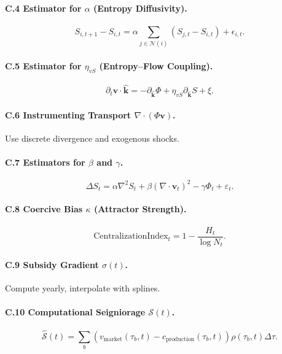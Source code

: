 \documentclass[12pt]{article}
\begin{document}
\paragraph{C.4 Estimator for \(\alpha\) (Entropy Diffusivity).}

\[
S_{i,t+1} - S_{i,t} = \alpha \sum_{j \in \mathcal{N}(i)} (S_{j,t} - S_{i,t}) + \epsilon_{i,t}.
\]

\paragraph{C.5 Estimator for \(\eta_{vS}\) (Entropy–Flow Coupling).}

\[
\partial_t \mathbf{v} \cdot \hat{\mathbf{k}} = -\partial_{\hat{\mathbf{k}}} \Phi + \eta_{vS} \partial_{\hat{\mathbf{k}}} S + \xi.
\]

\paragraph{C.6 Instrumenting Transport \(\nabla \cdot (\Phi \mathbf{v})\).}

Use discrete divergence and exogenous shocks.

\paragraph{C.7 Estimators for \(\beta\) and \(\gamma\).}

\[
\Delta S_t = \alpha \nabla^2 S_t + \beta (\nabla \cdot \mathbf{v}_t)^2 - \gamma \Phi_t + \varepsilon_t.
\]

\paragraph{C.8 Coercive Bias \(\kappa\) (Attractor Strength).}

\[
\text{CentralizationIndex}_t = 1 - \frac{H_t}{\log N_t}.
\]

\paragraph{C.9 Subsidy Gradient \(\sigma(t)\).}

Compute yearly, interpolate with splines.

\paragraph{C.10 Computational Seigniorage \(\mathcal{S}(t)\).}

\[
\widehat{\mathcal{S}}(t) = \sum_b (v_{\text{market}}(\tau_b, t) - c_{\text{production}}(\tau_b, t)) \rho(\tau_b, t) \Delta \tau.
\]
\end{document}
